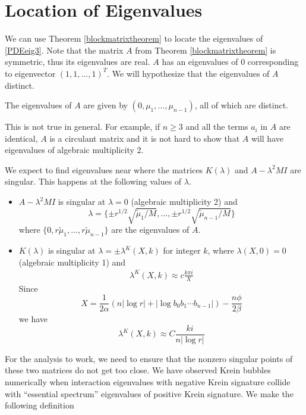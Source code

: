 \documentclass[thesis.tex]{subfiles}
\begin{document}
\section{Location of Eigenvalues}

We can use Theorem \ref{blockmatrixtheorem} to locate the eigenvalues of \eqref{PDEeig3}. Note that the matrix $A$ from Theorem \ref{blockmatrixtheorem} is symmetric, thus its eigenvalues are real. $A$ has an eigenvalues of 0 corresponding to eigenvector $(1, 1, \dots, 1)^T$. We will hypothesize that the eigenvalues of $A$ distinct. 

\begin{hypothesis}\label{Adistincteigs}
The eigenvalues of $A$ are given by $(0, \mu_1, \dots, \mu_{n-1})$, all of which are distinct.
\end{hypothesis}

This is not true in general. For example, if $n \geq 3$ and all the terms $a_i$ in $A$ are identical, $A$ is a circulant matrix and it is not hard to show that $A$ will have eigenvalues of algebraic multiplicity 2.

We expect to find eigenvalues near where the matrices $K(\lambda)$ and $A - \lambda^2 MI$ are singular. This happens at the following values of $\lambda$. 
\begin{itemize}
	\item $A - \lambda^2 M I$ is singular at $\lambda = 0$ (algebraic multiplicity 2) and 
	\[
	\lambda = \{ \pm r^{1/2} \sqrt{\tilde{\mu}_1/M}, \dots, \pm r^{1/2} \sqrt{\tilde{\mu}_{n-1}/M}\}
	\]
	where $\{0, r \tilde{\mu}_1, \dots, r \tilde{\mu}_{n-1}\}$ are the eigenvalues of $A$. 

	\item $K(\lambda)$ is singular at $\lambda = \pm \lambda^K(X,k)$ for integer $k$, where $\lambda(X, 0) = 0$ (algebraic multiplicity 1) and
	\begin{align}\label{lambdaXkapprox}
	\lambda^K(X,k) \approx c \frac{k \pi i }{X} 
	\end{align}
	Since 
	\[
	X = \frac{1}{2\alpha} (n |\log r| + |\log b_0 b_1 \cdots b_{n-1}| ) - \frac{n \phi}{2 \beta}
	\]
	we have
	\[
	\lambda^K(X,k) \approx C \frac{k i}{n |\log r|}
	\]
\end{itemize}  

For the analysis to work, we need to ensure that the nonzero singular points of these two matrices do not get too close. We have observed Krein bubbles numerically when interaction eigenvalues with negative Krein signature collide with ``essential spectrum'' eigenvalues of positive Krein signature. We make the following definition
\end{document}
